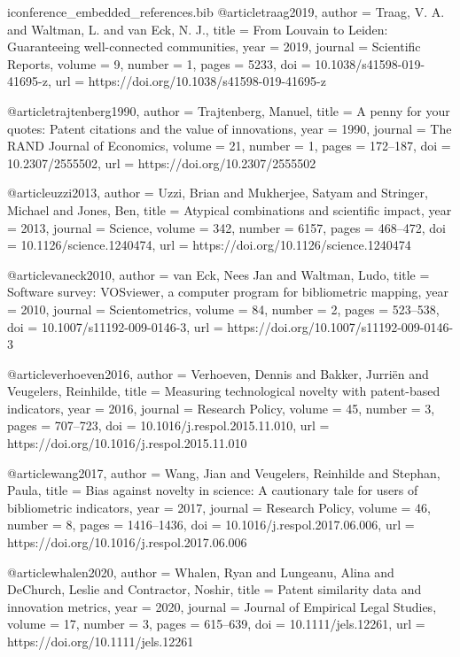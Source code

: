 \begin{filecontents*}[overwrite]{iconference_embedded_references.bib}
@article{traag2019,
  author = {Traag, V. A. and Waltman, L. and van Eck, N. J.},
  title = {From {Louvain} to {Leiden}: Guaranteeing well-connected communities},
  year = {2019},
  journal = {Scientific Reports},
  volume = {9},
  number = {1},
  pages = {5233},
  doi = {10.1038/s41598-019-41695-z},
  url = {https://doi.org/10.1038/s41598-019-41695-z}
}

@article{trajtenberg1990,
  author = {Trajtenberg, Manuel},
  title = {A penny for your quotes: Patent citations and the value of innovations},
  year = {1990},
  journal = {The RAND Journal of Economics},
  volume = {21},
  number = {1},
  pages = {172--187},
  doi = {10.2307/2555502},
  url = {https://doi.org/10.2307/2555502}
}

@article{uzzi2013,
  author = {Uzzi, Brian and Mukherjee, Satyam and Stringer, Michael and Jones, Ben},
  title = {Atypical combinations and scientific impact},
  year = {2013},
  journal = {Science},
  volume = {342},
  number = {6157},
  pages = {468--472},
  doi = {10.1126/science.1240474},
  url = {https://doi.org/10.1126/science.1240474}
}

@article{vaneck2010,
  author = {van Eck, Nees Jan and Waltman, Ludo},
  title = {Software survey: {VOSviewer}, a computer program for bibliometric mapping},
  year = {2010},
  journal = {Scientometrics},
  volume = {84},
  number = {2},
  pages = {523--538},
  doi = {10.1007/s11192-009-0146-3},
  url = {https://doi.org/10.1007/s11192-009-0146-3}
}

@article{verhoeven2016,
  author = {Verhoeven, Dennis and Bakker, Jurri{\"{e}}n and Veugelers, Reinhilde},
  title = {Measuring technological novelty with patent-based indicators},
  year = {2016},
  journal = {Research Policy},
  volume = {45},
  number = {3},
  pages = {707--723},
  doi = {10.1016/j.respol.2015.11.010},
  url = {https://doi.org/10.1016/j.respol.2015.11.010}
}

@article{wang2017,
  author = {Wang, Jian and Veugelers, Reinhilde and Stephan, Paula},
  title = {Bias against novelty in science: A cautionary tale for users of bibliometric indicators},
  year = {2017},
  journal = {Research Policy},
  volume = {46},
  number = {8},
  pages = {1416--1436},
  doi = {10.1016/j.respol.2017.06.006},
  url = {https://doi.org/10.1016/j.respol.2017.06.006}
}

@article{whalen2020,
  author = {Whalen, Ryan and Lungeanu, Alina and DeChurch, Leslie and Contractor, Noshir},
  title = {Patent similarity data and innovation metrics},
  year = {2020},
  journal = {Journal of Empirical Legal Studies},
  volume = {17},
  number = {3},
  pages = {615--639},
  doi = {10.1111/jels.12261},
  url = {https://doi.org/10.1111/jels.12261}
}


\end{filecontents*}
